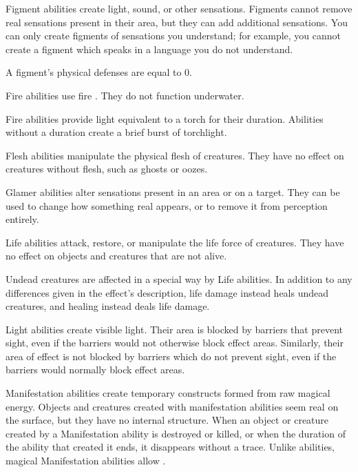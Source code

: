     Figment abilities create light, sound, or other sensations.
    Figments cannot remove real sensations present in their area, but they can add additional sensations.
    You can only create figments of sensations you understand; for example, you cannot create a figment which speaks in a language you do not understand.
    \par A figment's physical defenses are equal to 0.

     Fire abilities use fire . They do not function underwater.
    \par Fire abilities provide light equivalent to a torch for their duration.
    Abilities without a duration create a brief burst of torchlight.

     Flesh abilities manipulate the physical flesh of creatures.
    They have no effect on creatures without flesh, such as ghosts or oozes.

     Glamer abilities alter sensations present in an area or on a target.
    They can be used to change how something real appears, or to remove it from perception entirely.

     Life abilities attack, restore, or manipulate the life force of creatures.
    They have no effect on objects and creatures that are not alive.
    \par Undead creatures are affected in a special way by Life abilities.
    In addition to any differences given in the effect's description, life damage instead heals undead creatures, and healing instead deals life damage.

     Light abilities create visible light.
    Their area is blocked by barriers that prevent sight, even if the barriers would not otherwise block effect areas.
    Similarly, their area of effect is not blocked by barriers which do not prevent sight, even if the barriers would normally block effect areas.

     Manifestation abilities create temporary constructs formed from raw magical energy.
    Objects and creatures created with manifestation abilities seem real on the surface, but they have no internal structure.
    When an object or creature created by a Manifestation ability is destroyed or killed, or when the duration of the ability that created it ends, it disappears without a trace.
    Unlike  abilities, magical Manifestation abilities allow .

